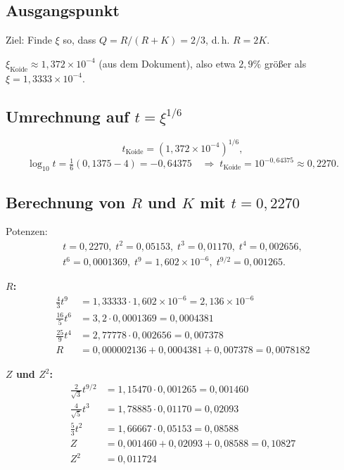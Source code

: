\subsection{Ausgangspunkt}

Ziel: Finde $\xi$ so, dass $Q=R/(R+K)=2/3$, d.\,h. $R=2K$.

$\xi_{\text{Koide}}\approx1{,}372\times10^{-4}$ (aus dem Dokument),
also etwa $2{,}9\%$ größer als $\xi=1{,}3333\times10^{-4}$.

\subsection{Umrechnung auf $t=\xi^{1/6}$}

\[
  t_{\text{Koide}}=(1{,}372\times10^{-4})^{1/6},
\]
\[
  \log_{10}t=\tfrac{1}{6}(0{,}1375-4)=-0{,}64375
  \quad\Rightarrow\; t_{\text{Koide}}=10^{-0{,}64375}\approx0{,}2270.
\]

\subsection{Berechnung von $R$ und $K$ mit $t=0{,}2270$}

Potenzen:
\begin{align*}
  t=0{,}2270,\; t^2=0{,}05153,\; t^3=0{,}01170,\; t^4=0{,}002656, \\[2pt]
  t^6=0{,}0001369,\; t^9=1{,}602\times10^{-6},\;
  t^{9/2}=0{,}001265.
\end{align*}

\textbf{$R$:}
\begin{align*}
  \tfrac{4}{3}t^9 &= 1{,}33333\cdot1{,}602\times10^{-6}=2{,}136\times10^{-6} \\
  \tfrac{16}{5}t^6 &= 3{,}2\cdot0{,}0001369=0{,}0004381 \\
  \tfrac{25}{9}t^4 &= 2{,}77778\cdot0{,}002656=0{,}007378 \\
  R &= 0{,}000002136+0{,}0004381+0{,}007378=0{,}0078182
\end{align*}

\textbf{$Z$ und $Z^2$:}
\begin{align*}
  \tfrac{2}{\sqrt{3}}t^{9/2} &= 1{,}15470\cdot0{,}001265=0{,}001460 \\
  \tfrac{4}{\sqrt{5}}t^3 &= 1{,}78885\cdot0{,}01170=0{,}02093 \\
  \tfrac{5}{3}t^2 &= 1{,}66667\cdot0{,}05153=0{,}08588 \\
  Z &= 0{,}001460+0{,}02093+0{,}08588=0{,}10827 \\
  Z^2 &= 0{,}011724
\end{align*}

